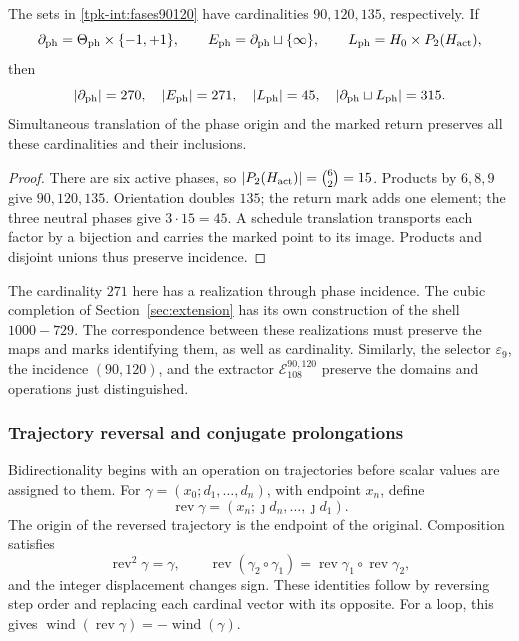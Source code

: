 \begin{proposition}
\label{tpk-int:cardinales}
The sets in \eqref{tpk-int:fases90120} have cardinalities
\(90,120,135\), respectively. If
\[
 \partial_{\rm ph}=\Theta_{\rm ph}\times\{-1,+1\},\qquad
 E_{\rm ph}=\partial_{\rm ph}\sqcup\{\infty\},\qquad
 L_{\rm ph}=H_0\times P_2(H_{\rm act}),
\]
then
\[
 |\partial_{\rm ph}|=270,\quad |E_{\rm ph}|=271,\quad
 |L_{\rm ph}|=45,\quad
 |\partial_{\rm ph}\sqcup L_{\rm ph}|=315.
\]
Simultaneous translation of the phase origin and the marked return preserves
all these cardinalities and their inclusions.
\end{proposition}
\begin{proof}
There are six active phases, so
\(|P_2(H_{\rm act})|=\binom62=15\). Products by
\(6,8,9\) give \(90,120,135\). Orientation doubles \(135\);
the return mark adds one element; the three neutral phases give
\(3\cdot15=45\). A schedule translation transports each
factor by a bijection and carries the marked point to its image. Products
and disjoint unions thus preserve incidence.
\end{proof}

The cardinality \(271\) here has a realization through phase
incidence. The cubic completion of Section~\ref{sec:extension} has
its own construction of the shell \(1000-729\). The correspondence
between these realizations must preserve the maps and marks identifying
them, as well as cardinality. Similarly, the selector
\(\varepsilon_9\), the incidence \((90,120)\), and the extractor
\(\mathcal E_{108}^{90,120}\) preserve the domains and operations
just distinguished.

\subsubsection{Trajectory reversal and conjugate prolongations}
\label{tpk-int:bidireccionalidad}

Bidirectionality begins with an operation on trajectories before
scalar values are assigned to them. For
\(\gamma=(x_0;d_1,\ldots,d_n)\), with endpoint \(x_n\), define
\[
 \operatorname{rev}\gamma
   =(x_n;\jmath d_n,\ldots,\jmath d_1).
\]
The origin of the reversed trajectory is the endpoint of the original.
Composition satisfies
\[
 \operatorname{rev}^2\gamma=\gamma,\qquad
 \operatorname{rev}(\gamma_2\circ\gamma_1)
   =\operatorname{rev}\gamma_1\circ\operatorname{rev}\gamma_2,
\]
and the integer displacement changes sign. These identities follow
by reversing step order and replacing each cardinal vector
with its opposite. For a loop, this gives
\(\operatorname{wind}(\operatorname{rev}\gamma)
=-\operatorname{wind}(\gamma)\).

